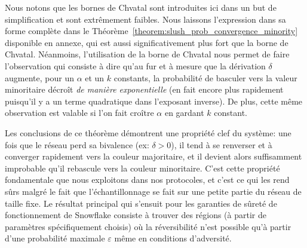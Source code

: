 \documentclass[letterpaper,twocolumn,10pt]{article}
\theoremstyle{definition}
\begin{document}

Nous notons que les bornes de Chvatal sont introduites ici dans un but de simplification et sont extrêmement faibles.
Nous laissons l'expression dans sa forme complète dans le Théorème~\ref{theorem:slush_prob_convergence_minority}
disponible en annexe, qui est aussi significativement plus fort que la borne de Chvatal.
Néanmoins, l'utilisation de la borne de Chvatal nous permet de faire l'observation qui consiste à dire qu'au fur et à
mesure que la dérivation $\delta$ augmente, pour un $\alpha$ et un $k$ constants, la probabilité de basculer vers la   %
valeur minoritaire décroît \emph{de manière exponentielle} (en fait encore plus rapidement puisqu'il y a un terme
quadratique dans l'exposant inverse). De plus, cette même observation est valable si l'on fait croître $\alpha$ en gardant
$k$ constant.

Les conclusions de ce théorème démontrent une propriété clef du système: une fois que le réseau perd sa bivalence
(ex: $\delta > 0$), il tend à se renverser et à converger rapidement vers la couleur majoritaire, et il devient alors
suffisamment improbable qu'il rebascule vers la couleur minoritaire. C'est cette propriété fondamentale que nous
exploitons dans nos protocoles, et c'est ce qui les rend sûrs malgré le fait que l'échantillonnage se fait sur une petite
partie du réseau de taille fixe. Le résultat principal qui s'ensuit pour les garanties de sûreté de fonctionnement de Snowflake consiste
à trouver des régions (à partir de paramètres spécifiquement choisis) où la réversibilité n'est possible qu'à partir
d'une probabilité maximale $\varepsilon$ même en conditions d'adversité.

\end{document}
